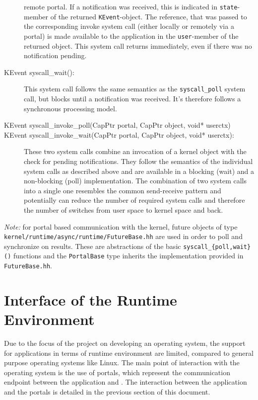 \begin{description}
remote portal. If a notification was received, this is indicated in
\texttt{state}-member of the returned \texttt{KEvent}-object. The reference,
that was passed to the corresponding invoke system call (either locally or
remotely via a portal) is made available to the application in the
\texttt{user}-member of the returned object. This system call returns
immediately, even if there was no notification pending.
\item[KEvent syscall\_wait():] This system call follows the same semantics as
the \texttt{syscall\_poll} system call, but blocks until a notification was
received. It's therefore follows a synchronous processing model.
\item[KEvent syscall\_invoke\_poll(CapPtr portal, CapPtr object, void* userctx)]
\item[KEvent syscall\_invoke\_wait(CapPtr portal, CapPtr object, void*
userctx):] These two system calls combine an invocation of a kernel object with
the check for pending notifications. They follow the semantics of the individual
system calls as described above and are available in a blocking (wait) and a
non-blocking (poll) implementation. The combination of two system calls into a
single one resembles the common send-receive pattern and potentially can reduce
the number of required system calls and therefore the number of switches from
user space to kernel space and back.
\end{description}

\noindent \emph{Note:} for portal based communication with the kernel, future
objects of type \texttt{kernel/runtime/async/runtime/FutureBase.hh} are used in
order to poll and synchronize on results. These are abstractions of the basic
\texttt{syscall\_\{poll,wait\}()} functions and the \texttt{PortalBase} type
inherits the implementation provided in \texttt{FutureBase.hh}.

\section{Interface of the \mythos Runtime Environment}
\label{sec:runtime-objects}
 Due to the focus of the
\mythos project on developing an operating system, the support for applications
in terms of runtime environment are limited, compared to general purpose
operating systems like Linux. The main point of interaction with the operating
system is the use of portals, which represent the communication endpoint between
the application and \mythos. The interaction between the application and the
portals is detailed in the previous section of this document.

